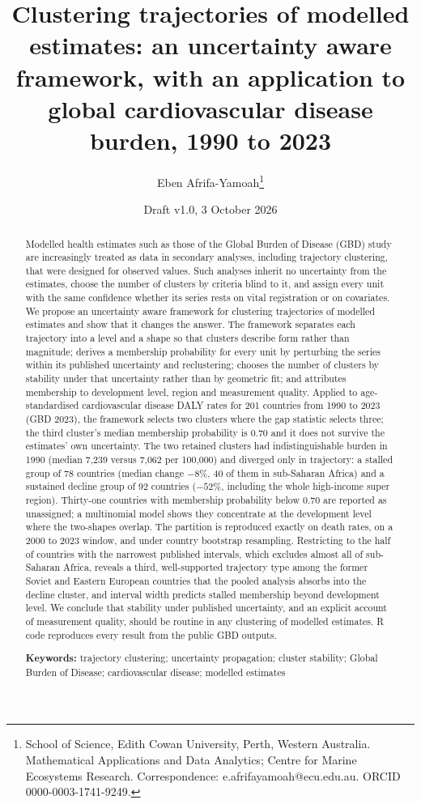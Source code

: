 \documentclass[11pt,a4paper]{article}
\title{Clustering trajectories of modelled estimates: an uncertainty aware framework, with an application to global cardiovascular disease burden, 1990 to 2023}
\author{Eben Afrifa-Yamoah\thanks{School of Science, Edith Cowan University, Perth, Western Australia. Mathematical Applications and Data Analytics; Centre for Marine Ecosystems Research. Correspondence: e.afrifayamoah@ecu.edu.au. ORCID 0000-0003-1741-9249.}}
\date{Draft v1.0, 3 October 2026}
\begin{document}
\maketitle

\begin{abstract}
\noindent Modelled health estimates such as those of the Global Burden of Disease (GBD) study are increasingly treated as data in secondary analyses, including trajectory clustering, that were designed for observed values. Such analyses inherit no uncertainty from the estimates, choose the number of clusters by criteria blind to it, and assign every unit with the same confidence whether its series rests on vital registration or on covariates. We propose an uncertainty aware framework for clustering trajectories of modelled estimates and show that it changes the answer. The framework separates each trajectory into a level and a shape so that clusters describe form rather than magnitude; derives a membership probability for every unit by perturbing the series within its published uncertainty and reclustering; chooses the number of clusters by stability under that uncertainty rather than by geometric fit; and attributes membership to development level, region and measurement quality. Applied to age-standardised cardiovascular disease DALY rates for 201 countries from 1990 to 2023 (GBD 2023), the framework selects two clusters where the gap statistic selects three; the third cluster's median membership probability is 0.70 and it does not survive the estimates' own uncertainty. The two retained clusters had indistinguishable burden in 1990 (median 7,239 versus 7,062 per 100,000) and diverged only in trajectory: a stalled group of 78 countries (median change $-8\%$, 40 of them in sub-Saharan Africa) and a sustained decline group of 92 countries ($-52\%$, including the whole high-income super region). Thirty-one countries with membership probability below 0.70 are reported as unassigned; a multinomial model shows they concentrate at the development level where the two-shapes overlap. The partition is reproduced exactly on death rates, on a 2000 to 2023 window, and under country bootstrap resampling. Restricting to the half of countries with the narrowest published intervals, which excludes almost all of sub-Saharan Africa, reveals a third, well-supported trajectory type among the former Soviet and Eastern European countries that the pooled analysis absorbs into the decline cluster, and interval width predicts stalled membership beyond development level. We conclude that stability under published uncertainty, and an explicit account of measurement quality, should be routine in any clustering of modelled estimates. R code reproduces every result from the public GBD outputs.

\medskip\noindent\textbf{Keywords:} trajectory clustering; uncertainty propagation; cluster stability; Global Burden of Disease; cardiovascular disease; modelled estimates
\end{abstract}
\end{document}
